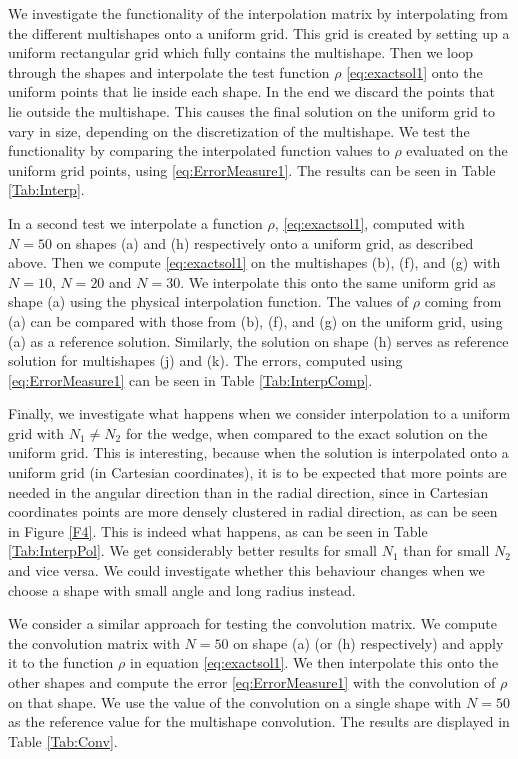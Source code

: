 We investigate the functionality of the interpolation matrix by interpolating from the different multishapes onto a uniform grid. This grid is created by setting up a uniform rectangular grid which fully contains the multishape. Then we loop through the shapes and interpolate the test function $\rho$ \eqref{eq:exactsol1} onto the uniform points that lie inside each shape. In the end we discard the points that lie outside the multishape. This causes the final solution on the uniform grid to vary in size, depending on the discretization of the multishape. We test the functionality by comparing the interpolated function values to $\rho$ evaluated on the uniform grid points, using \eqref{eq:ErrorMeasure1}. The results can be seen in Table \ref{Tab:Interp}.

In a second test we interpolate a function $\rho$, \eqref{eq:exactsol1}, computed with $N =50$ on shapes (a) and (h) respectively onto a uniform grid, as described above. Then we compute \eqref{eq:exactsol1} on the multishapes (b), (f), and (g) with $N = 10$, $N = 20$ and $N = 30$. We interpolate this onto the same uniform grid as shape (a) using the physical interpolation function. The values of $\rho$ coming from (a) can be compared with those from (b), (f), and (g) on the uniform grid, using (a) as a reference solution. Similarly, the solution on shape (h) serves as reference solution for multishapes (j) and (k). The errors, computed using \eqref{eq:ErrorMeasure1} can be seen in Table \ref{Tab:InterpComp}.

Finally, we investigate what happens when we consider interpolation to a uniform grid with $N_1 \neq N_2$ for the wedge, when compared to the exact solution on the uniform grid. This is interesting, because when the solution is interpolated onto a uniform grid (in Cartesian coordinates), it is to be expected that more points are needed in the angular direction than in the radial direction, since in Cartesian coordinates points are more densely clustered in radial direction, as can be seen in Figure \ref{F4}. This is indeed what happens, as can be seen in Table \ref{Tab:InterpPol}. We get considerably better results for small $N_1$ than for small $N_2$ and vice versa. We could investigate whether this behaviour changes when we choose a shape with small angle and long radius instead.

We consider a similar approach for testing the convolution matrix. We compute the convolution matrix with $N = 50$ on shape (a) (or (h) respectively) and apply it to the function $\rho$ in equation \eqref{eq:exactsol1}. We then interpolate this onto the other shapes and compute the error \eqref{eq:ErrorMeasure1} with the convolution of $\rho$ on that shape. We use the value of the convolution on a single shape with $N = 50$ as the reference value for the multishape convolution. The results are displayed in Table \ref{Tab:Conv}.

